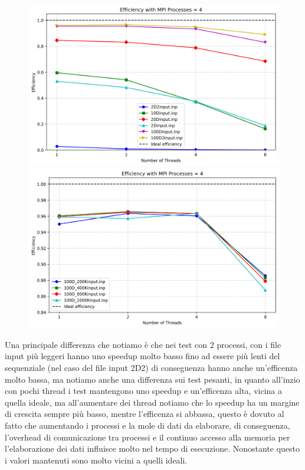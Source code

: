 \documentclass{article}
\begin{document}
\begin{figure}[ht]
\begin{minipage}{0.4\textwidth}
      \includegraphics[width=\linewidth]{../test_csv/plots/efficency/plot_omp_mpi_4_small_slurm.png}
    \end{minipage}
    \begin{minipage}{0.4\textwidth}
      \centering
      \includegraphics[width=\linewidth]{../test_csv/plots/efficency/plot_omp_mpi_4_big_slurm.png}
    \end{minipage}
  \end{figure}

  Una principale differenza che notiamo è che nei test con 2 processi, con i file input più leggeri hanno uno speedup molto basso fino ad essere più lenti del sequenziale (nel caso del file input 2D2) di conseguenza hanno anche un'efficenza molto bassa, ma 
  notiamo anche una differenza sui test pesanti, in quanto all'inzio con pochi thread i test mantengono uno speedup e un'efficenza alta, vicina a quella ideale, ma all'aumentare dei thread notiamo che lo speedup ha un margine di crescita 
  sempre più basso, mentre l'efficenza si abbassa, questo è dovuto al fatto che aumentando i processi e la mole di dati da elaborare, di conseguenza, l'overhead di comunicazione tra processi e il continuo accesso alla memoria 
  per l'elaborazione dei dati influisce molto nel tempo di esecuzione. Nonostante questo i valori mantenuti sono molto vicini a quelli ideali.
  
\end{document}
